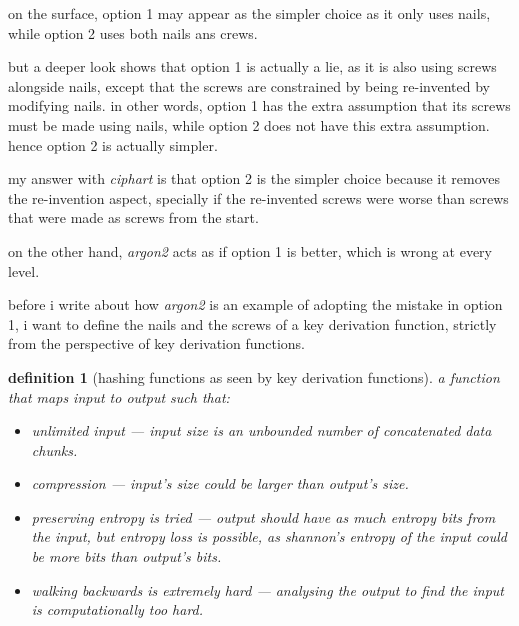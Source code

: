 \documentclass[twocolumn]{article}
\newtheorem{definition}{definition}[section]
\begin{document}
on the surface, option 1 may appear as the simpler choice as it only uses
nails, while option 2 uses both nails ans crews.

but a deeper look shows that option 1 is actually a lie, as it is also
using screws alongside nails, except that the screws are constrained by
being re-invented by modifying nails.  in other words, option 1 has the
extra assumption that its screws must be made using nails, while option 2
does not have this extra assumption.  hence option 2 is actually simpler.

my answer with \emph{ciphart} is that option 2 is the simpler choice
because it removes the re-invention aspect, specially if the re-invented
screws were worse than screws that were made as screws from the start.

on the other hand, \emph{argon2} acts as if option 1 is better, which is
wrong at every level.

before i write about how \emph{argon2} is an example of adopting the
mistake in option 1, i want to define the nails and the screws of a key
derivation function, strictly from the perspective of key derivation
functions.

\begin{definition}[hashing functions as seen by key derivation
functions]\label{def_kdf_hash}
    a function that maps input to output such that:
    \begin{itemize}
        \item unlimited input --- input size is an unbounded number of
        concatenated data chunks.

        \item compression --- input's size could be larger than output's
        size.

        \item preserving entropy is tried --- output should have as much
        entropy bits from the input, but entropy loss is possible, as
        shannon's entropy of the input could be more bits than output's
        bits.

        \item walking backwards is extremely hard --- analysing the output
        to find the input is computationally too hard.
    \end{itemize}
\end{definition}
\end{document}
